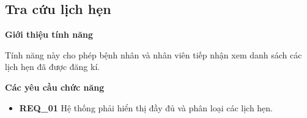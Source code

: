 \subsection{Tra cứu lịch hẹn}

\noindent \textbf{Giới thiệu tính năng}

Tính năng này cho phép bệnh nhân và nhân viên tiếp nhận xem danh sách các lịch hẹn đã được đăng kí.

\noindent \textbf{Các yêu cầu chức năng}
\begin{itemize}
  \item \textbf{REQ\_01} Hệ thống phải hiển thị đầy đủ và phân loại các lịch hẹn.
\end{itemize}
